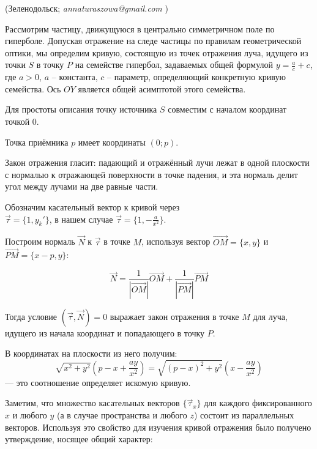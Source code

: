 

\vzmsinfo(Зеленодольск; {\it annaturaszowa@gmail.com} )




Рассмотрим частицу, движущуюся в центрально симметричном поле по гиперболе. Допуская отражение на следе частицы по правилам геометрической оптики, мы определим кривую, состоящую из точек отражения луча, идущего из точки $S$ в точку $P$ на семействе гипербол, задаваемых общей формулой $y= \frac ac + c$, где $a > 0$, $a$ – константа, $c$ – параметр, определяющий конкретную кривую семейства. Ось $OY$ является общей асимптотой этого семейства.

Для простоты описания точку источника $S$ совместим с началом координат точкой $0$.

Точка приёмника $p$ имеет координаты $(0;p)$.

Закон отражения гласит: падающий и отражённый лучи лежат в одной плоскости с нормалью к отражающей поверхности в точке падения, и эта нормаль делит угол между лучами на две равные части.

Обозначим касательный вектор к кривой через \\ $\vec \tau = \{ 1, y_k' \}$, в нашем случае $\vec \tau = \{ 1,- \frac{a}{x^2} \}$.

Построим нормаль $\vec N$ к $\vec \tau$ в точке $M$, используя вектор $\overrightarrow{OM}=\{x,y\}$ и $\overrightarrow{PM}=\{x-p,y\}$:

$$ \vec{N}=\frac{1}{|\overrightarrow{OM}|}\overrightarrow{OM}+\frac{1}{|\overrightarrow{PM}|}\overrightarrow{PM} $$

Тогда условие $(\vec \tau , \vec N)=0$ выражает закон отражения в точке $M$ для луча, идущего из начала координат и попадающего в точку $P$.

В координатах на плоскости из него получим:
\[
\sqrt{x^2+y^2}
\left( p-x+ \frac{ay}{x^2} \right)
=
\sqrt{{(p-x)}^2+y^2}
\left( x - \frac{ay}{x^2} \right)
\]
    --- это соотношение определяет искомую кривую.

Заметим, что множество касательных векторов $\{ \vec \tau_x \}$ для каждого фиксированного $x$ и любого $y$ (а в случае пространства и любого $z$) состоит из параллельных векторов. Используя это свойство для изучения кривой отражения было получено утверждение, носящее общий характер:

